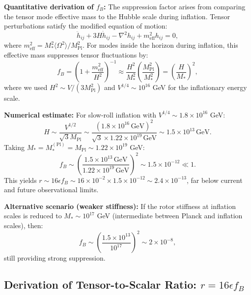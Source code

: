 \documentclass[11pt,a4paper]{article}
\numberwithin{equation}{section}
\theoremstyle{plain}
\theoremstyle{definition}
\theoremstyle{remark}
\begin{document}
\textbf{Quantitative derivation of $f_B$:} The suppression factor arises from comparing the tensor mode effective mass to the Hubble scale during inflation. Tensor perturbations satisfy the modified equation of motion:
\begin{equation}
\ddot{h}_{ij} + 3H\dot{h}_{ij} - \nabla^2 h_{ij} + m_{\text{eff}}^2 h_{ij} = 0,
\end{equation}
where $m_{\text{eff}}^2 = M_*^2 \langle \Omega^2 \rangle / M_{\mathrm{Pl}}^2$. For modes inside the horizon during inflation, this effective mass suppresses tensor fluctuations by:
\begin{equation}
f_B = \left(1 + \frac{m_{\text{eff}}^2}{H^2}\right)^{-1} \approx \frac{H^2}{M_*^2} \left(\frac{M_{\mathrm{Pl}}^2}{M_*^2}\right) = \left(\frac{H}{M_*}\right)^2,
\end{equation}
where we used $H^2 \sim V/(3M_{\mathrm{Pl}}^2)$ and $V^{1/4} \sim 10^{16}$ GeV for the inflationary energy scale.

\textbf{Numerical estimate:} For slow-roll inflation with $V^{1/4} \sim 1.8 \times 10^{16}$ GeV:
\begin{equation}
H \sim \frac{V^{1/2}}{\sqrt{3}M_{\mathrm{Pl}}} \sim \frac{(1.8\times 10^{16}\,\text{GeV})^2}{\sqrt{3}\times 1.22\times 10^{19}\,\text{GeV}} \sim 1.5 \times 10^{13}\,\text{GeV}.
\end{equation}
Taking $M_* = M_*^{(\text{Pl})} = M_{\mathrm{Pl}} \sim 1.22 \times 10^{19}$ GeV:
\begin{equation}
f_B \sim \left(\frac{1.5 \times 10^{13}\,\text{GeV}}{1.22 \times 10^{19}\,\text{GeV}}\right)^2 \sim 1.5 \times 10^{-12} \ll 1.
\end{equation}
This yields $r \sim 16\epsilon f_B \sim 16 \times 10^{-2} \times 1.5 \times 10^{-12} \sim 2.4 \times 10^{-13}$, far below current and future observational limits.

\textbf{Alternative scenario (weaker stiffness):} If the rotor stiffness at inflation scales is reduced to $M_* \sim 10^{17}$ GeV (intermediate between Planck and inflation scales), then:
\begin{equation}
f_B \sim \left(\frac{1.5 \times 10^{13}}{10^{17}}\right)^2 \sim 2 \times 10^{-8},
\end{equation}
still providing strong suppression.

\subsection{Derivation of Tensor-to-Scalar Ratio: $r = 16\epsilon f_B$}
\end{document}
